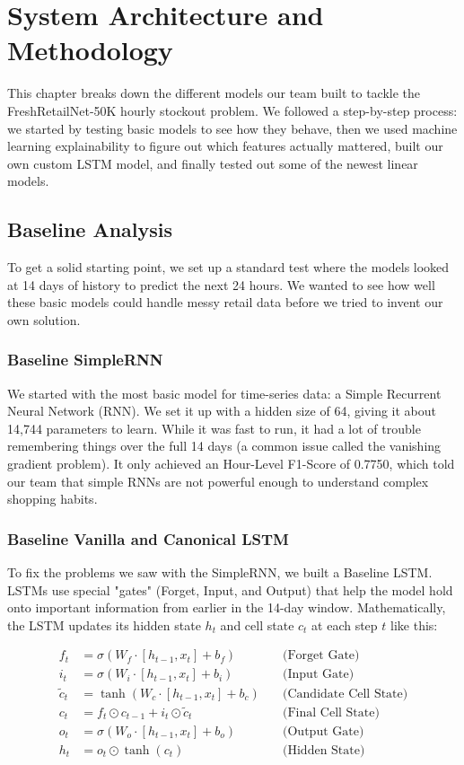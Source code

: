 \chapter{System Architecture and Methodology}
\label{chap:methodology}

This chapter breaks down the different models our team built to tackle the FreshRetailNet-50K hourly stockout problem. We followed a step-by-step process: we started by testing basic models to see how they behave, then we used machine learning explainability to figure out which features actually mattered, built our own custom LSTM model, and finally tested out some of the newest linear models.

\section{Baseline Analysis}

To get a solid starting point, we set up a standard test where the models looked at 14 days of history to predict the next 24 hours. We wanted to see how well these basic models could handle messy retail data before we tried to invent our own solution.

\subsection{Baseline SimpleRNN}
We started with the most basic model for time-series data: a Simple Recurrent Neural Network (RNN). We set it up with a hidden size of 64, giving it about 14,744 parameters to learn. While it was fast to run, it had a lot of trouble remembering things over the full 14 days (a common issue called the vanishing gradient problem). It only achieved an Hour-Level F1-Score of 0.7750, which told our team that simple RNNs are not powerful enough to understand complex shopping habits.

\subsection{Baseline Vanilla and Canonical LSTM}
To fix the problems we saw with the SimpleRNN, we built a Baseline LSTM. LSTMs use special "gates" (Forget, Input, and Output) that help the model hold onto important information from earlier in the 14-day window. Mathematically, the LSTM updates its hidden state $h_t$ and cell state $c_t$ at each step $t$ like this:

\begin{align}
    f_t &= \sigma(W_f \cdot [h_{t-1}, x_t] + b_f) \quad &\text{(Forget Gate)} \\
    i_t &= \sigma(W_i \cdot [h_{t-1}, x_t] + b_i) \quad &\text{(Input Gate)} \\
    \tilde{c}_t &= \tanh(W_c \cdot [h_{t-1}, x_t] + b_c) \quad &\text{(Candidate Cell State)} \\
    c_t &= f_t \odot c_{t-1} + i_t \odot \tilde{c}_t \quad &\text{(Final Cell State)} \\
    o_t &= \sigma(W_o \cdot [h_{t-1}, x_t] + b_o) \quad &\text{(Output Gate)} \\
    h_t &= o_t \odot \tanh(c_t) \quad &\text{(Hidden State)}
\end{align}

